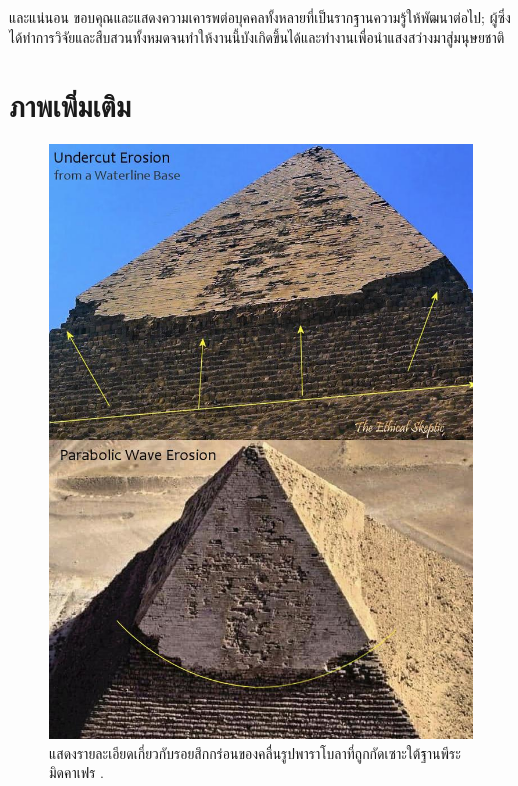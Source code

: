\documentclass[10pt,twocolumn,letterpaper]{article}
\begin{document}
และแน่นอน ขอบคุณและแสดงความเคารพต่อบุคคลทั้งหลายที่เป็นรากฐานความรู้ให้พัฒนาต่อไป; ผู้ซึ่งได้ทำการวิจัยและสืบสวนทั้งหมดจนทำให้งานนี้บังเกิดขึ้นได้และทำงานเพื่อนำแสงสว่างมาสู่มนุษยชาติ

\clearpage
\twocolumn

\section{ภาพเพิ่มเติม}

\vspace{4cm}

\begin{figure}[htbp]
\begin{center}
   \includegraphics[width=1\linewidth]{wave.jpg}
\end{center}
   \caption{แสดงรายละเอียดเกี่ยวกับรอยสึกกร่อนของคลื่นรูปพาราโบลาที่ถูกกัดเซาะใต้ฐานพีระมิดคาเฟร \cite{27}.}
\label{fig:19}
\label{fig:onecol}
\end{figure}
\end{document}
